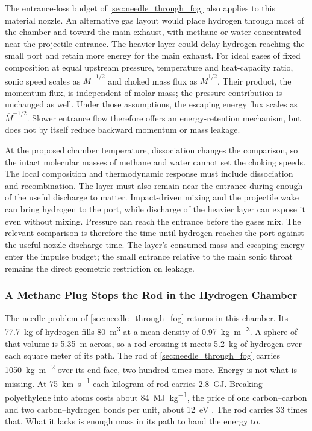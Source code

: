 \documentclass{article}
\begin{document}
The entrance-loss budget of \autoref{sec:needle_through_fog} also applies to this material nozzle. An alternative gas layout would place hydrogen through most of the chamber and toward the main exhaust, with methane or water concentrated near the projectile entrance. The heavier layer could delay hydrogen reaching the small port and retain more energy for the main exhaust. For ideal gases of fixed composition at equal upstream pressure, temperature and heat-capacity ratio, sonic speed scales as $\overline{M}^{-1/2}$ and choked mass flux as $\overline{M}^{1/2}$. Their product, the momentum flux, is independent of molar mass; the pressure contribution is unchanged as well. Under those assumptions, the escaping energy flux scales as $\overline{M}^{-1/2}$. Slower entrance flow therefore offers an energy-retention mechanism, but does not by itself reduce backward momentum or mass leakage.

At the proposed chamber temperature, dissociation changes the comparison, so the intact molecular masses of methane and water cannot set the choking speeds. The local composition and thermodynamic response must include dissociation and recombination. The layer must also remain near the entrance during enough of the useful discharge to matter. Impact-driven mixing and the projectile wake can bring hydrogen to the port, while discharge of the heavier layer can expose it even without mixing. Pressure can reach the entrance before the gases mix. The relevant comparison is therefore the time until hydrogen reaches the port against the useful nozzle-discharge time. The layer's consumed mass and escaping energy enter the impulse budget; the small entrance relative to the main sonic throat remains the direct geometric restriction on leakage.

\subsubsection{A Methane Plug Stops the Rod in the Hydrogen Chamber}\label{sec:material_chamber_plug}

The needle problem of \autoref{sec:needle_through_fog} returns in this chamber. Its \SI{77.7}{\kilogram} of hydrogen fills \SI{80}{\cubic\meter} at a mean density of \SI{0.97}{\kilogram\per\cubic\meter}. A sphere of that volume is \SI{5.35}{\meter} across, so a rod crossing it meets \SI{5.2}{\kilogram} of hydrogen over each square meter of its path. The rod of \autoref{sec:needle_through_fog} carries \SI{1050}{\kilogram\per\square\meter} over its end face, two hundred times more. Energy is not what is missing. At \SI{75}{\kilo\meter\per\second} each kilogram of rod carries \SI{2.8}{\giga\joule}. Breaking polyethylene into atoms costs about \SI{84}{\mega\joule\per\kilogram}, the price of one carbon--carbon and two carbon--hydrogen bonds per  unit, about \SI{12}{\electronvolt} \cite{crc_handbook}. The rod carries 33 times that. What it lacks is enough mass in its path to hand the energy to.
\end{document}

